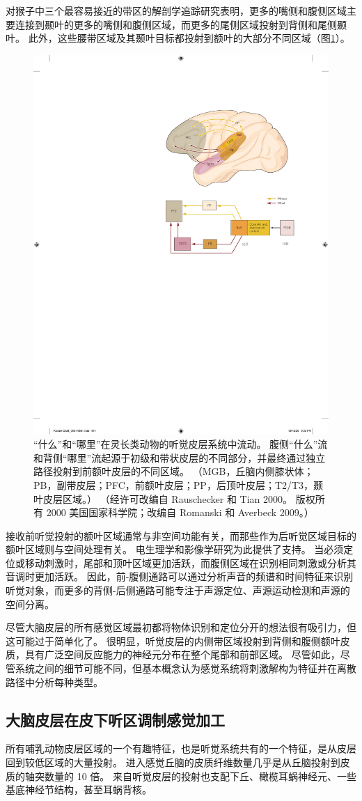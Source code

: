 对猴子中三个最容易接近的带区的解剖学追踪研究表明，更多的嘴侧和腹侧区域主要连接到颞叶的更多的嘴侧和腹侧区域，而更多的尾侧区域投射到背侧和尾侧颞叶。 
此外，这些腰带区域及其颞叶目标都投射到额叶的大部分不同区域（图\ref{fig:28_11}）。

\begin{figure}[htbp]
	\centering
	\includegraphics[width=0.5\linewidth]{chap28/fig_28_11}
	\caption{“什么”和“哪里”在灵长类动物的听觉皮层系统中流动。 
		腹侧“什么”流和背侧“哪里”流起源于初级和带状皮层的不同部分，并最终通过独立路径投射到前额叶皮层的不同区域。
		（MGB，丘脑内侧膝状体；PB，副带皮层；PFC，前额叶皮层；PP，后顶叶皮层；T2/T3，颞叶皮层区域。）
		（经许可改编自 Rauschecker 和 Tian 2000。
		版权所有 2000 美国国家科学院；改编自 Romanski 和 Averbeck 2009。）}
	\label{fig:28_11}
\end{figure}

接收前听觉投射的额叶区域通常与非空间功能有关，而那些作为后听觉区域目标的额叶区域则与空间处理有关。 
电生理学和影像学研究为此提供了支持。 
当必须定位或移动刺激时，尾部和顶叶区域更加活跃，而腹侧区域在识别相同刺激或分析其音调时更加活跃。 
因此，前-腹侧通路可以通过分析声音的频谱和时间特征来识别听觉对象，而更多的背侧-后侧通路可能专注于声源定位、声源运动检测和声源的空间分离。

尽管大脑皮层的所有感觉区域最初都将物体识别和定位分开的想法很有吸引力，但这可能过于简单化了。 
很明显，听觉皮层的内侧带区域投射到背侧和腹侧额叶皮质，具有广泛空间反应能力的神经元分布在整个尾部和前部区域。 
尽管如此，尽管系统之间的细节可能不同，但基本概念认为感觉系统将刺激解构为特征并在离散路径中分析每种类型。


\subsection{大脑皮层在皮下听区调制感觉加工}
所有哺乳动物皮层区域的一个有趣特征，也是听觉系统共有的一个特征，是从皮层回到较低区域的大量投射。 
进入感觉丘脑的皮质纤维数量几乎是从丘脑投射到皮质的轴突数量的 10 倍。 
来自听觉皮层的投射也支配下丘、橄榄耳蜗神经元、一些基底神经节结构，甚至耳蜗背核。


